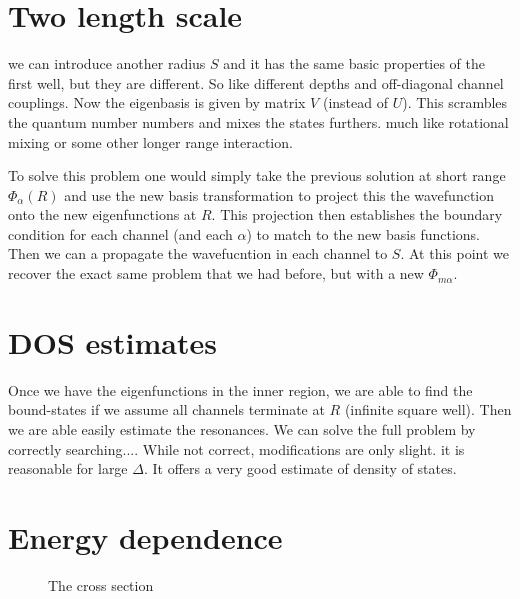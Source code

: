 \documentclass[twocolumn,showpacs,amsmath,amssymb]{revtex4}
\begin{document}
\section{Two length scale}
we can introduce another radius $S$ and it has the same basic
properties of the first well, but they are different. So like different depths
and off-diagonal channel couplings. 
Now the eigenbasis is given by matrix $V$ (instead of $U$).
This scrambles the quantum number numbers and mixes the states
furthers. much like rotational mixing or some other longer range interaction. 

To solve this problem one would simply take the previous solution
at short range $\Phi_\alpha(R)$ and use the new basis transformation
to project this the wavefunction onto the new eigenfunctions at $R$.
This projection then establishes the boundary condition
for each channel (and each $\alpha$) to match to the  
new basis functions. Then we can a propagate the wavefucntion
in each channel to $S$. At this point we recover the exact same problem
that we had before, but with a new $\Phi_{m\alpha}$.


\section{DOS estimates}
 
Once we have the eigenfunctions in the inner region, we are able to find
the bound-states if we assume all channels terminate at $R$ (infinite square well). Then we are able easily estimate the resonances.
We can solve the full problem by correctly searching....
While not correct, modifications are only slight.
it is reasonable for large $\Delta$.
It offers a very good estimate of density of states.


\section{Energy dependence}

\begin{figure}%
\caption{The cross section}
\label{energy1}
\end{figure}

{}

\end{document}
